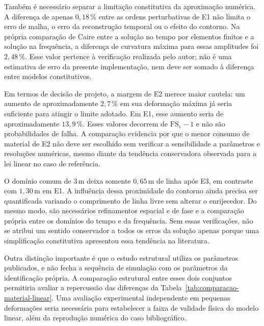 \documentclass[arial,centeredequations,english,brazilian,oneside,section=TITLE]{ifes8}
\begin{document}
Também é necessário separar a limitação constitutiva da aproximação
numérica. A diferença de apenas $0{,}18\,\%$ entre as ordens
perturbativas de E1 não limita o erro de malha, o erro da reconstrução
temporal ou o efeito do contorno. Na própria comparação de Caire entre
a solução no tempo por elementos finitos e a solução na frequência,
a diferença de curvatura máxima para essas amplitudes foi
$2{,}48\,\%$. Esse valor pertence à verificação realizada pelo autor;
não é uma estimativa de erro da presente implementação, nem deve ser
somado à diferença entre modelos constitutivos.

Em termos de decisão de projeto, a margem de E2 merece maior cautela:
um aumento de aproximadamente $2{,}7\,\%$ em sua deformação máxima já
seria suficiente para atingir o limite adotado. Em E1, esse aumento
seria de aproximadamente $13{,}9\,\%$. Esses valores decorrem de
$\mathrm{FS}_{\varepsilon}-1$ e não são probabilidades de falha.
A comparação evidencia por que o menor consumo de material de E2 não
deve ser escolhido sem verificar a sensibilidade a parâmetros e
resoluções numéricas, mesmo diante da tendência conservadora observada
para a lei linear no caso de referência.

O domínio comum de $3\,\mathrm{m}$ deixa somente $0{,}65\,\mathrm{m}$
de linha após E3, em contraste com $1{,}30\,\mathrm{m}$ em E1.
A influência dessa proximidade do contorno ainda precisa ser quantificada
variando o comprimento de linha livre sem alterar o enrijecedor.
Do mesmo modo, são necessários refinamentos espacial e de fase e a
comparação própria entre os domínios do tempo e da frequência.
Sem essas verificações, não se atribui um sentido conservador a todos
os erros da solução apenas porque uma simplificação constitutiva
apresentou essa tendência na literatura.

Outra distinção importante é que o estudo estrutural utiliza os
parâmetros publicados, e não fecha a sequência de simulação com os
parâmetros da identificação própria. A comparação estrutural entre esses
dois conjuntos permitiria avaliar a repercussão das diferenças da
Tabela~\ref{tab:comparacao-material-linear}. Uma avaliação experimental
independente em pequenas deformações seria necessária para estabelecer
a faixa de validade física do modelo linear, além da reprodução numérica
do caso bibliográfico.
\end{document}
